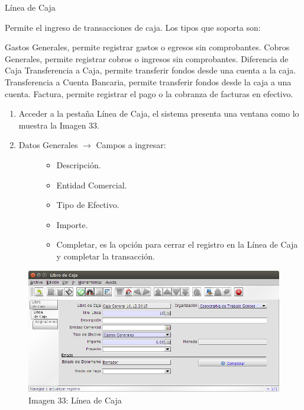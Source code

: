 \documentclass[letterpaper,10pt,spanish]{sphinxmanual}
\begin{document}
Línea de Caja

Permite el ingreso de transacciones de caja. Los tipos que soporta son:

Gastos Generales, permite registrar gastos o egresos sin comprobantes.
Cobros Generales, permite registrar cobros o ingresos sin comprobantes.
Diferencia de Caja
Transferencia a Caja, permite transferir fondos desde una cuenta a la caja.
Transferencia a Cuenta Bancaria, permite transferir fondos desde la caja a una cuenta.
Factura, permite registrar el pago o la cobranza de facturas en efectivo.
\begin{enumerate}
\item {} 
Acceder a la pestaña Línea de Caja, el sistema presenta una ventana como lo muestra la Imagen 33.

\item {} \begin{description}
\item[{Datos Generales \(\rightarrow\) Campos a ingresar:}] \leavevmode\begin{itemize}
\item {} 
Descripción.

\item {} 
Entidad Comercial.

\item {} 
Tipo de Efectivo.

\item {} 
Importe.

\item {} 
Completar, es la opción para cerrar el registro en la Línea de Caja y completar la transacción.

\end{itemize}

\end{description}

\end{enumerate}
\begin{figure}[htbp]
\centering
\capstart

\includegraphics{ly_cajas_33.png}
\caption{Imagen 33: Línea de Caja}\end{figure}
\end{document}
